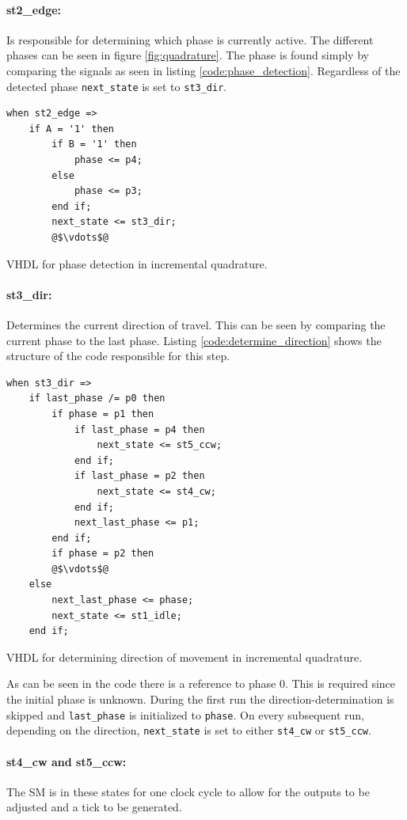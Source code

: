 \paragraph{st2\_edge:} %
Is responsible for determining which phase is currently active.
The different phases can be seen in figure \ref{fig:quadrature}.
The phase is found simply by comparing the signals as seen in listing \ref{code:phase_detection}.
Regardless of the detected phase \texttt{next\_state} is set to \texttt{st3\_dir}.
\begin{listing}[H]
\begin{verbatim}
when st2_edge =>
	if A = '1' then
	    if B = '1' then
	        phase <= p4;
	    else
	        phase <= p3;
	    end if;
	    next_state <= st3_dir;
	    @$\vdots$@
\end{verbatim}
\caption{VHDL for phase detection in incremental quadrature.}
\label{code:phase_detection}
\end{listing}
\paragraph{st3\_dir:} %
Determines the current direction of travel.
This can be seen by comparing the current phase to the last phase.
Listing \ref{code:determine_direction} shows the structure of the code responsible for this step.
\begin{listing}[H]
\begin{verbatim}
when st3_dir =>
	if last_phase /= p0 then
	    if phase = p1 then
	        if last_phase = p4 then
	            next_state <= st5_ccw;
	        end if;
	        if last_phase = p2 then
	            next_state <= st4_cw;
	        end if;
	        next_last_phase <= p1;
	    end if;
	    if phase = p2 then
	    @$\vdots$@
    else
        next_last_phase <= phase;
        next_state <= st1_idle;
    end if;
\end{verbatim}
\caption[VHDL for determining direction of movement.]{VHDL for determining direction of movement in incremental quadrature.}
\label{code:determine_direction}
\end{listing}
As can be seen in the code there is a reference to phase 0.
This is required since the initial phase is unknown.
During the first run the direction-determination is skipped and \texttt{last\_phase} is initialized to \texttt{phase}.
On every subsequent run, depending on the direction, \texttt{next\_state} is set to either \texttt{st4\_cw} or \texttt{st5\_ccw}.
\paragraph{st4\_cw and st5\_ccw:} %
The SM is in these states for one clock cycle to allow for the outputs to be adjusted and a tick to be generated.
